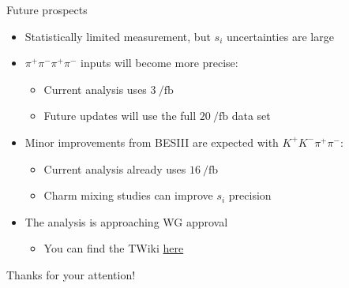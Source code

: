\documentclass[xcolor={dvipsnames}]{beamer}
\begin{document}
\begin{frame}{Future prospects}
  \vspace{0.6cm}
  \begin{itemize}
    \setlength\itemsep{1.4em}
    \item{Statistically limited measurement, but $s_i$ uncertainties are large}
    \item{$\pi^+\pi^-\pi^+\pi^-$ inputs will become more precise:}
    \begin{itemize}
      \item{Current analysis uses $\SI{3}{\per\femto\barn}$}
      \item{Future updates will use the full $\SI{20}{\per\femto\barn}$ data set}
    \end{itemize}
    \item{Minor improvements from BESIII are expected with $K^+K^-\pi^+\pi^-$:}
    \begin{itemize}
      \item{Current analysis already uses $\SI{16}{\per\femto\barn}$}
      \item{Charm mixing studies can improve $s_i$ precision}
    \end{itemize}
    \item{The analysis is approaching WG approval}
    \begin{itemize}
      \item{You can find the TWiki \href{https://twiki.cern.ch/twiki/bin/viewauth/LHCbPhysics/BPGGSZB2DhD2hhpipiModelIndependent}{here}}
    \end{itemize}
  \end{itemize}
  \vspace{0.3cm}
  \begin{center}
    {\huge Thanks for your attention!}
  \end{center}
\end{frame}
\end{document}
